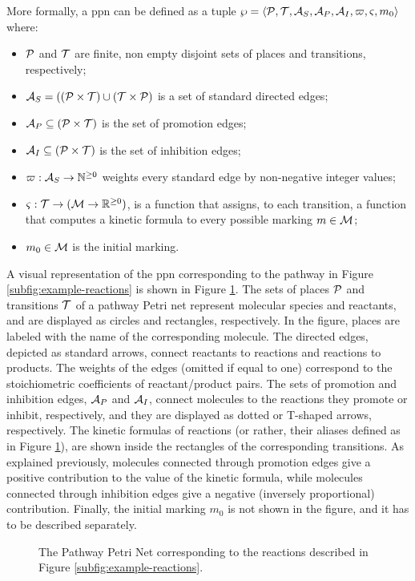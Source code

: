 More formally, a \gls{ppn} can be defined as a tuple $\wp = \Tuple{\Cal{P},\Cal{T},\Cal{A}_{S}, \Cal{A}_{P},\Cal{A}_{I},\varpi,\varsigma,m_0}$ where:
\begin{itemize}
    \item $\Cal{P}$ and $\Cal{T}$ are finite, non empty disjoint sets of places and transitions, respectively;
    \item $\Cal{A}_{S} = ((\Cal{P}\times \Cal{T}) \cup (\Cal{T}\times \Cal{P})$ is a set of standard directed edges;
    \item $\Cal{A}_{P} \subseteq (\Cal{P} \times \Cal{T})$ is the set of promotion edges;
    \item $\Cal{A}_{I} \subseteq (\Cal{P} \times \Cal{T})$ is the set of inhibition edges;
    \item $\varpi: \Cal{A}_{S} \shortrightarrow \mathbb{N}^{\geq 0}$ weights every standard edge by non-negative integer values;
    \item $\varsigma:\Cal{T} \shortrightarrow (\Cal{M} \rightarrow \mathbb{R}^{\geq 0})$,  is a function that assigns, to each transition, a function that computes a kinetic formula to every possible marking $m \in \Cal{M}$;
    \item $m_0 \in \Cal{M}$ is the initial marking.
\end{itemize}
A visual representation of the \gls{ppn} corresponding to the pathway in Figure \ref{subfig:example-reactions} is shown in Figure \ref{subfig:pathway-petri-net}. The sets of places $\Cal{P}$ and transitions $\Cal{T}$ of a pathway Petri net represent molecular species and reactants, and are displayed as circles and rectangles, respectively. In the figure, places are labeled with the name of the corresponding molecule. The directed edges, depicted as standard arrows, connect reactants to reactions and reactions to products. The weights of the edges (omitted if equal to one) correspond to the stoichiometric coefficients of reactant/product pairs. The sets of promotion and inhibition edges, $\Cal{A}_{P}$ and $\Cal{A}_{I}$, connect molecules to the reactions they promote or inhibit, respectively, and they are displayed as dotted or T-shaped arrows, respectively. The kinetic formulas of reactions (or rather, their aliases defined as in Figure \ref{subfig:pathway-petri-net}), are shown inside the rectangles of the corresponding transitions. As explained previously, molecules connected through promotion edges give a positive contribution to the value of the kinetic formula, while molecules connected through inhibition edges give a negative (inversely proportional) contribution. Finally, the initial marking $m_0$ is not shown in the figure, and it has to be described separately.
\begin{figure}[h!]
    \centering
    \resizebox{.6\textwidth}{!}{}
    \caption{The Pathway Petri Net corresponding to the reactions described in Figure \ref{subfig:example-reactions}.}
    \label{subfig:pathway-petri-net}
\end{figure}

